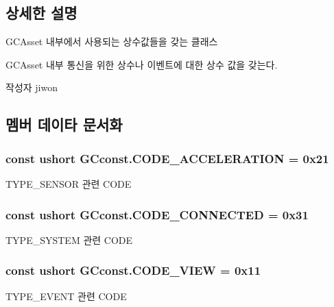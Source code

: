 \subsection{상세한 설명}
G\+C\+Asset 내부에서 사용되는 상수값들을 갖는 클래스

G\+C\+Asset 내부 통신을 위한 상수나 이벤트에 대한 상수 값을 갖는다. \begin{DoxyAuthor}{작성자}
jiwon 
\end{DoxyAuthor}


\subsection{멤버 데이타 문서화}
\hypertarget{class_g_cconst_a84fdd379bbb0355e8d1abec0338c7305}{}
\subsubsection[{C\+O\+D\+E\+\_\+\+A\+C\+C\+E\+L\+E\+R\+A\+T\+I\+O\+N}]{\setlength{\rightskip}{0pt plus 5cm}const ushort G\+Cconst.\+C\+O\+D\+E\+\_\+\+A\+C\+C\+E\+L\+E\+R\+A\+T\+I\+O\+N = 0x21}\label{class_g_cconst_a84fdd379bbb0355e8d1abec0338c7305}
T\+Y\+P\+E\+\_\+\+S\+E\+N\+S\+O\+R 관련 C\+O\+D\+E \hypertarget{class_g_cconst_a03588045b902424b55b70524bd81a7d0}{}
\subsubsection[{C\+O\+D\+E\+\_\+\+C\+O\+N\+N\+E\+C\+T\+E\+D}]{\setlength{\rightskip}{0pt plus 5cm}const ushort G\+Cconst.\+C\+O\+D\+E\+\_\+\+C\+O\+N\+N\+E\+C\+T\+E\+D = 0x31}\label{class_g_cconst_a03588045b902424b55b70524bd81a7d0}
T\+Y\+P\+E\+\_\+\+S\+Y\+S\+T\+E\+M 관련 C\+O\+D\+E \hypertarget{class_g_cconst_a33241116bb534c10ba1a5400547a74b0}{}
\subsubsection[{C\+O\+D\+E\+\_\+\+V\+I\+E\+W}]{\setlength{\rightskip}{0pt plus 5cm}const ushort G\+Cconst.\+C\+O\+D\+E\+\_\+\+V\+I\+E\+W = 0x11}\label{class_g_cconst_a33241116bb534c10ba1a5400547a74b0}
T\+Y\+P\+E\+\_\+\+E\+V\+E\+N\+T 관련 C\+O\+D\+E \hypertarget{class_g_cconst_a13a353e3da52e3a0454487664c360dab}{}

